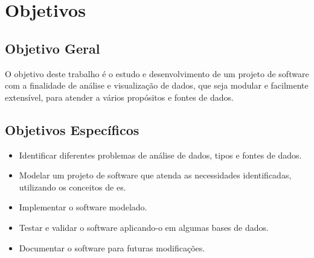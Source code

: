 \section{Objetivos}
\label{sec:objetivos}

    \subsection{Objetivo Geral}
    \label{subsec:objetivo-geral}

    O objetivo deste trabalho é o estudo e desenvolvimento de um projeto de software com a finalidade de análise e visualização de dados, que seja modular e facilmente extensível, para atender a vários propósitos e fontes de dados.

    \subsection{Objetivos Específicos}
    \label{subsec:objetivos-especificos}

    \begin{itemize}
        \item Identificar diferentes problemas de análise de dados, tipos e fontes de dados.
        \item Modelar um projeto de software que atenda as necessidades identificadas, utilizando os conceitos de \ac{es}.
        \item Implementar o software modelado.
        \item Testar e validar o software aplicando-o em algumas bases de dados.
        \item Documentar o software para futuras modificações.
    \end{itemize}
